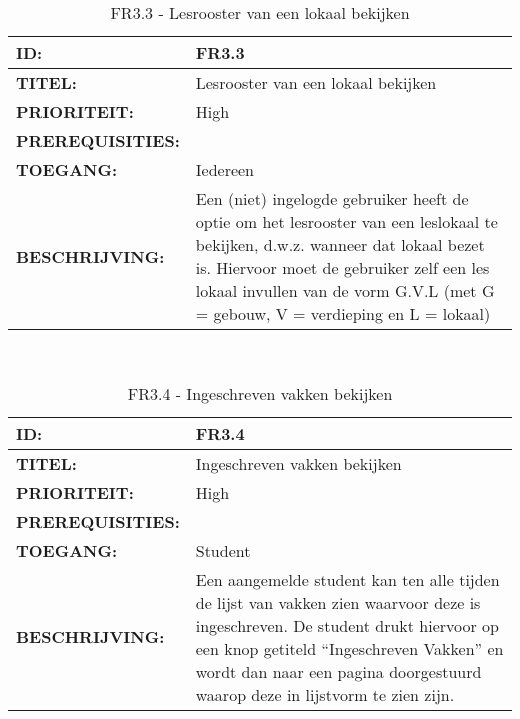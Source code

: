 \noindent\begin{table}[H]
            \begin{tabular}{l | p{10cm}}
                \textbf{ID:} & FR3.3 \\ \hline
                \textbf{TITEL:} & Lesrooster van een lokaal bekijken\\ \hline
                \textbf{PRIORITEIT:} &  High \\ \hline
                \textbf{PREREQUISITIES:} & \\ \hline
                \textbf{TOEGANG:} &  Iedereen \\ \hline
                \textbf{BESCHRIJVING:} & Een (niet) ingelogde gebruiker heeft de optie om het lesrooster van een leslokaal te bekijken, d.w.z. wanneer dat lokaal bezet is. 
                                        Hiervoor moet de gebruiker zelf een les lokaal invullen van de vorm G.V.L (met G = gebouw, V = verdieping en L = lokaal)\\
            \end{tabular}\\
            \caption{FR3.3 - Lesrooster van een lokaal bekijken}
            \label{tab:FR3.3 - Lesrooster van een lokaal bekijken}
        \end{table}
   
\noindent\begin{table}[H]
            \begin{tabular}{l | p{10cm}}
                \textbf{ID:} & FR3.4 \\ \hline
                \textbf{TITEL:} & Ingeschreven vakken bekijken\\ \hline
                \textbf{PRIORITEIT:} &  High \\ \hline
                \textbf{PREREQUISITIES:} & \\ \hline
                \textbf{TOEGANG:} &  Student \\ \hline
                \textbf{BESCHRIJVING:} & Een aangemelde student kan ten alle tijden de lijst van vakken zien waarvoor deze is ingeschreven. De student drukt hiervoor op een knop getiteld “Ingeschreven Vakken” en wordt dan naar een pagina doorgestuurd waarop deze in lijstvorm te zien zijn.\\
            \end{tabular}\\
            \caption{FR3.4 - Ingeschreven vakken bekijken}
            \label{tab:FR3.4 - Ingeschreven vakken bekijken}
        \end{table}  

